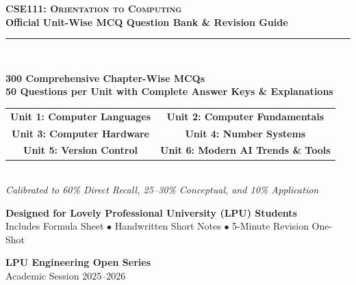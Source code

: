 \begin{titlepage}
\pagecolor{CSNavy}
\color{white}
\vspace*{1.5cm}

\begin{center}
    {\Huge \bfseries \scshape CSE111: Orientation to Computing}\\[5mm]
    {\LARGE \bfseries Official Unit-Wise MCQ Question Bank \& Revision Guide}\\[8mm]
    {\color{LPUOrange}\rule{0.8\textwidth}{2pt}}\\[10mm]

    \begin{tcolorbox}[enhanced, width=0.88\textwidth, colback=white, colframe=LPUOrange, boxrule=1.5pt, arc=3mm, halign=center]
        \color{DarkSlate}
        \vspace{2mm}
        {\Large\bfseries 300 Comprehensive Chapter-Wise MCQs}\\[3mm]
        {\large\bfseries 50 Questions per Unit with Complete Answer Keys \& Explanations}\\[3mm]
        \begin{tabular}{cc}
            \color{CSNavy}\textbf{Unit 1: Computer Languages} & \quad \color{CSNavy}\textbf{Unit 2: Computer Fundamentals} \\
            \color{CSNavy}\textbf{Unit 3: Computer Hardware}  & \quad \color{CSNavy}\textbf{Unit 4: Number Systems} \\
            \color{CSNavy}\textbf{Unit 5: Version Control}    & \quad \color{CSNavy}\textbf{Unit 6: Modern AI Trends \& Tools} \\
        \end{tabular}\\[3mm]
        \textit{Calibrated to 60\% Direct Recall, 25--30\% Conceptual, and 10\% Application}
        \vspace{2mm}
    \end{tcolorbox}

    \vfill

    {\large \bfseries Designed for Lovely Professional University (LPU) Students}\\[2mm]
    {\small Includes Formula Sheet $\bullet$ Handwritten Short Notes $\bullet$ 5-Minute Revision One-Shot}\\[10mm]

    \begin{tcolorbox}[width=0.6\textwidth, colback=CSNavy!80!black, colframe=white, boxrule=0.5pt, halign=center]
        \color{white}
        \textbf{LPU Engineering Open Series}\\[1mm]
        {\footnotesize Academic Session 2025--2026}
    \end{tcolorbox}
    \vspace*{1cm}
\end{center}
\end{titlepage}
\nopagecolor
\newpage
